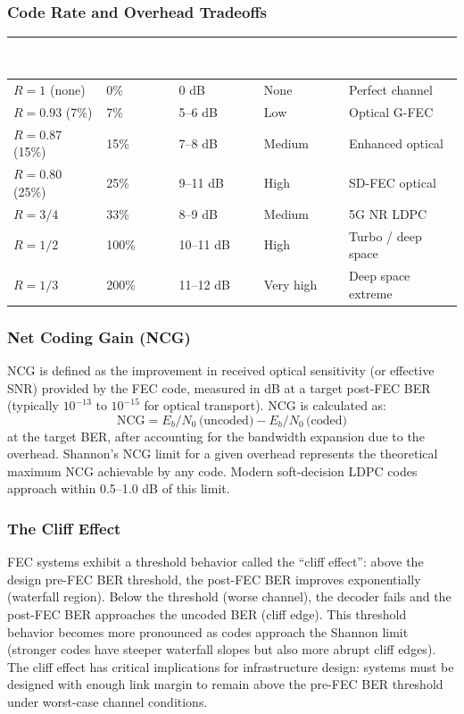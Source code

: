 \documentclass[11pt,letterpaper]{article}
\newcommand{\tableheader}[1]{\textbf{\sffamily\textcolor{white}{#1}}}
\begin{document}
\subsubsection{Code Rate and Overhead Tradeoffs}

\begin{center}
\begin{tabularx}{\textwidth}{L{2.8cm}C{1.8cm}C{2cm}C{2.2cm}X}
\toprule
{}
\tableheader{Code Rate} & \tableheader{Overhead} & \tableheader{NCG Range} & \tableheader{Complexity} & \tableheader{Typical Use} \\
\midrule
$R = 1$ (none) & 0\% & 0 dB & None & Perfect channel \\
$R = 0.93$ (7\%) & 7\% & 5--6 dB & Low & Optical G-FEC \\
$R = 0.87$ (15\%) & 15\% & 7--8 dB & Medium & Enhanced optical \\
$R = 0.80$ (25\%) & 25\% & 9--11 dB & High & SD-FEC optical \\
$R = 3/4$ & 33\% & 8--9 dB & Medium & 5G NR LDPC \\
$R = 1/2$ & 100\% & 10--11 dB & High & Turbo / deep space \\
$R = 1/3$ & 200\% & 11--12 dB & Very high & Deep space extreme \\
\bottomrule
\end{tabularx}
\end{center}

\subsubsection{Net Coding Gain (NCG)}

NCG is defined as the improvement in received optical sensitivity (or effective SNR) provided by the FEC code, measured in dB at a target post-FEC BER (typically $10^{-13}$ to $10^{-15}$ for optical transport). NCG is calculated as:
$$\text{NCG} = E_b/N_0\,\text{(uncoded)} - E_b/N_0\,\text{(coded)}$$
at the target BER, after accounting for the bandwidth expansion due to the overhead. Shannon's NCG limit for a given overhead represents the theoretical maximum NCG achievable by any code. Modern soft-decision LDPC codes approach within 0.5--1.0 dB of this limit.

\subsubsection{The Cliff Effect}

FEC systems exhibit a threshold behavior called the ``cliff effect'': above the design pre-FEC BER threshold, the post-FEC BER improves exponentially (waterfall region). Below the threshold (worse channel), the decoder fails and the post-FEC BER approaches the uncoded BER (cliff edge). This threshold behavior becomes more pronounced as codes approach the Shannon limit (stronger codes have steeper waterfall slopes but also more abrupt cliff edges). The cliff effect has critical implications for infrastructure design: systems must be designed with enough link margin to remain above the pre-FEC BER threshold under worst-case channel conditions.
\end{document}

